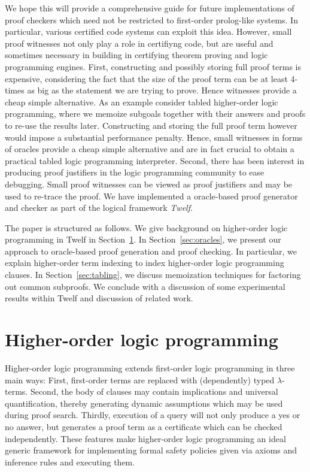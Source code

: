 \documentclass{acmconf}
\begin{document}
We hope this will provide a comprehensive guide for future
implementations of proof checkers which need not be restricted to
first-order prolog-like systems. In particular, various
certified code systems can exploit this idea. However, small proof
witnesses not only play a role in certifiyng code, but are useful and
sometimes necessary in building in certifying theorem proving and
logic programming engines. First, constructing and possibly storing
full proof terms is expensive, considering the fact that the size of
the proof term can be at least 4-times as big as the statement we are
trying to prove. Hence witnesses provide a cheap
simple alternative. As an example consider tabled higher-order logic
programming, where we memoize subgoals together with their answers and
proofs to re-use the results later. Constructing and storing the full
proof term however would impose a substantial performance
penalty. Hence, small witnesses in forms of oracles  provide a cheap
simple alternative and are in fact crucial to obtain a practical
tabled logic programming interpreter. Second, there has been interest
in producing proof justifiers in the logic programming community to
ease debugging. Small proof witnesses can be viewed as proof
justifiers and may be used to re-trace the proof. We have implemented
a oracle-based proof generator and checker as part of the logical
framework {\em Twelf}.  

The paper is structured as follows. We give background on
higher-order logic programming in Twelf in Section~\ref{sec:twelf}. In
Section~\ref{sec:oracles}, we present our approach to oracle-based
proof generation and proof checking. In particular, we explain
higher-order term indexing to index higher-order logic programming
clauses. In Section~\ref{sec:tabling}, we discuss memoization techniques for
factoring out common subproofs. We conclude with a discussion of some
experimental results within Twelf and discussion of related work.

\section{Higher-order logic programming}\label{sec:twelf}

Higher-order logic programming extends first-order logic programming
in three main ways: First, first-order terms are replaced with
(dependently) typed $\lambda$-terms. Second, the body of clauses may
contain implications and universal quantification, thereby generating
dynamic assumptions which may be used during proof search. Thirdly,
execution of a query will not only produce a yes or no answer, but
generates a proof term as a certificate which can be checked
independently. These features make higher-order logic programming an
ideal generic framework for implementing formal safety policies given via
axioms and inference rules and executing them.
\end{document}
